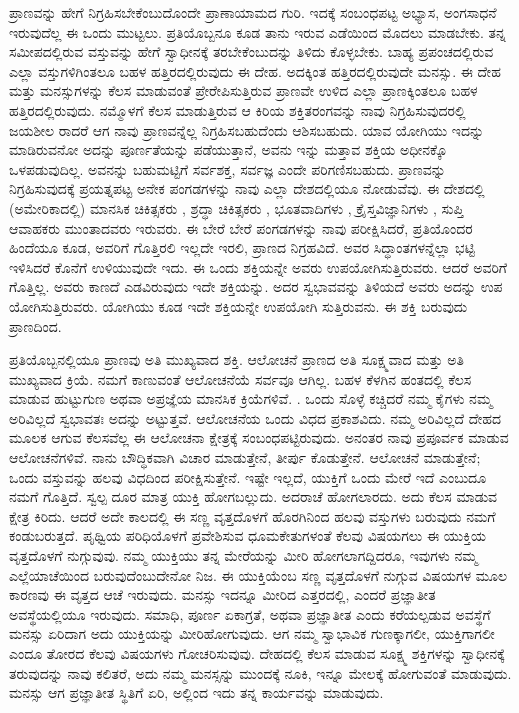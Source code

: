 ಪ್ರಾಣವನ್ನು ಹೇಗೆ ನಿಗ್ರಹಿಸಬೇಕೆಂಬುದೊಂದೇ ಪ್ರಾಣಾಯಾಮದ ಗುರಿ. ಇದಕ್ಕೆ ಸಂಬಂಧಪಟ್ಟ ಅಭ್ಯಾಸ, ಅಂಗಸಾಧನೆ ಇರುವುದೆಲ್ಲ ಈ ಒಂದು ಮುಟ್ಟಲು. ಪ್ರತಿಯೊಬ್ಬನೂ ಕೂಡ ತಾನು ಇರುವ ಎಡೆಯಿಂದ ಮೊದಲು ಮಾಡಬೇಕು. ತನ್ನ ಸಮೀಪದಲ್ಲಿರುವ ವಸ್ತುವನ್ನು ಹೇಗೆ ಸ್ವಾಧೀನಕ್ಕೆ ತರಬೇಕೆಂಬುದನ್ನು ತಿಳಿದು ಕೊಳ್ಳಬೇಕು. ಬಾಹ್ಯ ಪ್ರಪಂಚದಲ್ಲಿರುವ ಎಲ್ಲಾ ವಸ್ತುಗಳಿಗಿಂತಲೂ ಬಹಳ ಹತ್ತಿರದಲ್ಲಿರುವುದು ಈ ದೇಹ. ಅದಕ್ಕಿಂತ ಹತ್ತಿರದಲ್ಲಿರುವುದೇ ಮನಸ್ಸು. ಈ ದೇಹ ಮತ್ತು ಮನಸ್ಸುಗಳನ್ನು ಕೆಲಸ ಮಾಡುವಂತೆ ಪ್ರೇರೇಪಿಸುತ್ತಿರುವ ಪ್ರಾಣವೇ ಉಳಿದ ಎಲ್ಲಾ ಪ್ರಾಣಕ್ಕಿಂತಲೂ ಬಹಳ ಹತ್ತಿರದಲ್ಲಿರುವುದು. ನಮ್ಮೊಳಗೆ ಕೆಲಸ ಮಾಡುತ್ತಿರುವ ಆ ಕಿರಿಯ ಶಕ್ತಿತರಂಗವನ್ನು ನಾವು ನಿಗ್ರಹಿಸುವುದರಲ್ಲಿ ಜಯಶೀಲ ರಾದರೆ ಆಗ ನಾವು ಪ್ರಾಣವನ್ನೆಲ್ಲ ನಿಗ್ರಹಿಸಬಹುದೆಂದು ಆಶಿಸಬಹುದು. ಯಾವ ಯೋಗಿಯು ಇದನ್ನು ಮಾಡಿರುವನೋ ಅದನ್ನು ಪೂರ್ಣತೆಯನ್ನು ಪಡೆಯುತ್ತಾನೆ, ಅವನು ಇನ್ನು ಮತ್ತಾವ ಶಕ್ತಿಯ ಅಧೀನಕ್ಕೊ ಒಳಪಡುವುದಿಲ್ಲ. ಅವನನ್ನು ಬಹುಮಟ್ಟಿಗೆ ಸರ್ವಶಕ್ತ, ಸರ್ವಜ್ಞ ಎಂದೇ ಪರಿಗಣಿಸಬಹುದು. ಪ್ರಾಣವನ್ನು ನಿಗ್ರಹಿಸುವುದಕ್ಕೆ ಪ್ರಯತ್ನಪಟ್ಟ ಅನೇಕ ಪಂಗಡಗಳನ್ನು ನಾವು ಎಲ್ಲಾ ದೇಶದಲ್ಲಿಯೂ ನೋಡುವೆವು. ಈ ದೇಶದಲ್ಲಿ (ಅಮೇರಿಕಾದಲ್ಲಿ) ಮಾನಸಿಕ ಚಿಕಿತ್ಸಕರು , ಶ್ರದ್ಧಾ ಚಿಕಿತ್ಸಕರು , ಭೂತವಾದಿಗಳು , ಕ್ರೈಸ್ತವಿಜ್ಞಾನಿಗಳು , ಸುಪ್ತಿ ಆವಾಹಕರು  ಮುಂತಾದವರು ಇರುವರು. ಈ ಬೇರೆ ಬೇರೆ ಪಂಗಡಗಳನ್ನು ನಾವು ಪರೀಕ್ಷಿಸಿದರೆ, ಪ್ರತಿಯೊಂದರ ಹಿಂದೆಯೂ ಕೂಡ, ಅವರಿಗೆ ಗೊತ್ತಿರಲಿ ಇಲ್ಲದೇ ಇರಲಿ, ಪ್ರಾಣದ ನಿಗ್ರಹವಿದೆ. ಅವರ ಸಿದ್ಧಾಂತಗಳನ್ನೆಲ್ಲಾ ಭಟ್ಟಿ ಇಳಿಸಿದರೆ ಕೊನೆಗೆ ಉಳಿಯುವುದೇ ಇದು. ಈ ಒಂದು ಶಕ್ತಿಯನ್ನೇ ಅವರು ಉಪಯೋಗಿಸುತ್ತಿರುವರು. ಆದರೆ ಅವರಿಗೆ ಗೊತ್ತಿಲ್ಲ. ಅವರು ಕಾಣದೆ ಎಡವಿರುವುದು ಇದೇ ಶಕ್ತಿಯನ್ನು. ಅದರ ಸ್ವಭಾವವನ್ನು ತಿಳಿಯದೆ ಅವರು ಅದನ್ನು ಉಪ ಯೋಗಿಸುತ್ತಿರುವರು. ಯೋಗಿಯು ಕೂಡ ಇದೇ ಶಕ್ತಿಯನ್ನೇ ಉಪಯೋಗಿ ಸುತ್ತಿರುವನು. ಈ ಶಕ್ತಿ ಬರುವುದು ಪ್ರಾಣದಿಂದ. 

ಪ್ರತಿಯೊಬ್ಬನಲ್ಲಿಯೂ ಪ್ರಾಣವು ಅತಿ ಮುಖ್ಯವಾದ ಶಕ್ತಿ. ಆಲೋಚನೆ ಪ್ರಾಣದ ಅತಿ ಸೂಕ್ಷ್ಮವಾದ ಮತ್ತು ಅತಿ ಮುಖ್ಯವಾದ ಕ್ರಿಯೆ. ನಮಗೆ ಕಾಣುವಂತೆ ಆಲೋಚನೆಯೆ ಸರ್ವವೂ ಆಗಿಲ್ಲ. ಬಹಳ ಕೆಳಗಿನ ಹಂತದಲ್ಲಿ ಕೆಲಸ ಮಾಡುವ ಹುಟ್ಟುಗುಣ  ಅಥವಾ ಅಪ್ರಜ್ಞೆಯ ಮಾನಸಿಕ ಕ್ರಿಯೆಗಳಿವೆ. . ಒಂದು ಸೊಳ್ಳೆ ಕಚ್ಚಿದರೆ ನಮ್ಮ ಕೈಗಳು ನಮ್ಮ ಅರಿವಿಲ್ಲದೆ ಸ್ವಭಾವತಃ ಅದನ್ನು ಅಟ್ಟುತ್ತವೆ. ಆಲೋಚನೆಯ ಒಂದು ವಿಧದ ಪ್ರಕಾಶವಿದು. ನಮ್ಮ ಅರಿವಿಲ್ಲದೆ ದೇಹದ ಮೂಲಕ ಆಗುವ ಕೆಲಸವೆಲ್ಲ ಈ ಆಲೋಚನಾ ಕ್ಷೇತ್ರಕ್ಕೆ ಸಂಬಂಧಪಟ್ಟಿರುವುದು. ಅನಂತರ ನಾವು ಪ್ರಪೂರ್ವಕ ಮಾಡುವ ಆಲೋಚನೆಗಳಿವೆ. ನಾನು ಬೌದ್ಧಿಕವಾಗಿ ವಿಚಾರ ಮಾಡುತ್ತೇನೆ, ತೀರ್ಪು ಕೊಡುತ್ತೇನೆ. ಆಲೋಚನೆ ಮಾಡುತ್ತೇನೆ; ಒಂದು ವಸ್ತುವನ್ನು ಹಲವು ವಿಧದಿಂದ ಪರೀಕ್ಷಿಸುತ್ತೇನೆ. ಇಷ್ಟೇ ಇಲ್ಲದೆ, ಯುಕ್ತಿಗೆ ಒಂದು ಮೇರೆ ಇದೆ ಎಂಬುದೂ ನಮಗೆ ಗೊತ್ತಿದೆ. ಸ್ವಲ್ಪ ದೂರ ಮಾತ್ರ ಯುಕ್ತಿ ಹೋಗಬಲ್ಲುದು. ಅದರಾಚೆ ಹೋಗಲಾರದು. ಅದು ಕೆಲಸ ಮಾಡುವ ಕ್ಷೇತ್ರ ಕಿರಿದು. ಆದರೆ ಅದೇ ಕಾಲದಲ್ಲಿ ಈ ಸಣ್ಣ ವೃತ್ತದೊಳಗೆ ಹೊರಗಿನಿಂದ ಹಲವು ವಸ್ತುಗಳು ಬರುವುದು ನಮಗೆ ಕಂಡುಬರುತ್ತದೆ. ಪೃಥ್ವಿಯ ಪರಿಧಿಯೊಳಗೆ ಪ್ರವೇಶಿಸುವ ಧೂಮಕೇತುಗಳಂತೆ ಕೆಲವು ವಿಷಯಗಲು ಈ ಯುಕ್ತಿಯ ವೃತ್ತದೊಳಗೆ ನುಗ್ಗುವುವು. ನಮ್ಮ ಯುಕ್ತಿಯು ತನ್ನ ಮೇರೆಯನ್ನು ಮೀರಿ ಹೋಗಲಾಗದ್ದಿದರೂ, ಇವುಗಳು ನಮ್ಮ ಎಲ್ಲೆಯಾಚೆಯಿಂದ ಬರುವುದೆಂಬುದೇನೋ ನಿಜ. ಈ ಯುಕ್ತಿಯೆಂಬ ಸಣ್ಣ ವೃತ್ತದೊಳಗೆ ನುಗ್ಗುವ ವಿಷಯಗಳ ಮೂಲ ಕಾರಣವು ಈ ವೃತ್ತದ ಆಚೆ ಇರುವುದು. ಮನಸ್ಸು ಇದನ್ನೂ ಮೀರಿದ ಎತ್ತರದಲ್ಲಿ, ಎಂದರೆ ಪ್ರಜ್ಞಾತೀತ ಅವಸ್ಥೆಯಲ್ಲಿಯೂ  ಇರುವುದು. ಸಮಾಧಿ, ಪೂರ್ಣ ಏಕಾಗ್ರತೆ, ಅಥವಾ ಪ್ರಜ್ಞಾತೀತ ಎಂದು ಕರೆಯಲ್ಪಡುವ ಅವಸ್ಥೆಗೆ ಮನಸ್ಸು ಏರಿದಾಗ ಅದು ಯುಕ್ತಿಯನ್ನು ಮೀರಿಹೋಗುವುದು. ಆಗ ನಮ್ಮ ಸ್ವಾಭಾವಿಕ ಗುಣಕ್ಕಾಗಲೀ, ಯುಕ್ತಿಗಾಗಲೀ ಎಂದೂ ತೋರದ ಕೆಲವು ವಿಷಯಗಳು ಗೋಚರಿಸುವುವು. ದೇಹದಲ್ಲಿ ಕೆಲಸ ಮಾಡುವ ಸೂಕ್ಷ್ಮ ಶಕ್ತಿಗಳನ್ನು ಸ್ವಾಧೀನಕ್ಕೆ ತರುವುದನ್ನು ನಾವು ಕಲಿತರೆ, ಅದು ನಮ್ಮ ಮನಸ್ಸನ್ನು ಮುಂದಕ್ಕೆ ನೂಕಿ, ಇನ್ನೂ ಮೇಲಕ್ಕೆ ಹೋಗುವಂತೆ ಮಾಡುವುದು. ಮನಸ್ಸು ಆಗ ಪ್ರಜ್ಞಾತೀತ ಸ್ಥಿತಿಗೆ ಏರಿ, ಅಲ್ಲಿಂದ ಇದು ತನ್ನ ಕಾರ್ಯವನ್ನು ಮಾಡುವುದು. 

